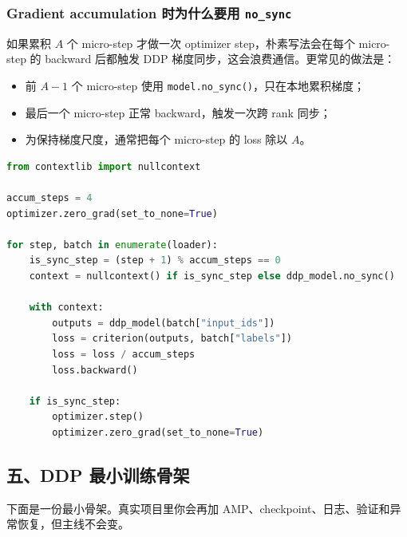 \subsubsection*{Gradient accumulation 时为什么要用 \texttt{no\_sync}}

如果累积 $A$ 个 micro-step 才做一次 optimizer step，朴素写法会在每个 micro-step 的 backward 后都触发 DDP 梯度同步，这会浪费通信。更常见的做法是：

\begin{itemize}[leftmargin=1.5em]
  \item 前 $A-1$ 个 micro-step 使用 \texttt{model.no\_sync()}，只在本地累积梯度；
  \item 最后一个 micro-step 正常 backward，触发一次跨 rank 同步；
  \item 为保持梯度尺度，通常把每个 micro-step 的 loss 除以 $A$。
\end{itemize}

\begin{lstlisting}[language=Python, caption=DDP gradient accumulation 的典型写法]
from contextlib import nullcontext

accum_steps = 4
optimizer.zero_grad(set_to_none=True)

for step, batch in enumerate(loader):
    is_sync_step = (step + 1) % accum_steps == 0
    context = nullcontext() if is_sync_step else ddp_model.no_sync()

    with context:
        outputs = ddp_model(batch["input_ids"])
        loss = criterion(outputs, batch["labels"])
        loss = loss / accum_steps
        loss.backward()

    if is_sync_step:
        optimizer.step()
        optimizer.zero_grad(set_to_none=True)
\end{lstlisting}

\subsection{五、DDP 最小训练骨架}

下面是一份最小骨架。真实项目里你会再加 AMP、checkpoint、日志、验证和异常恢复，但主线不会变。

